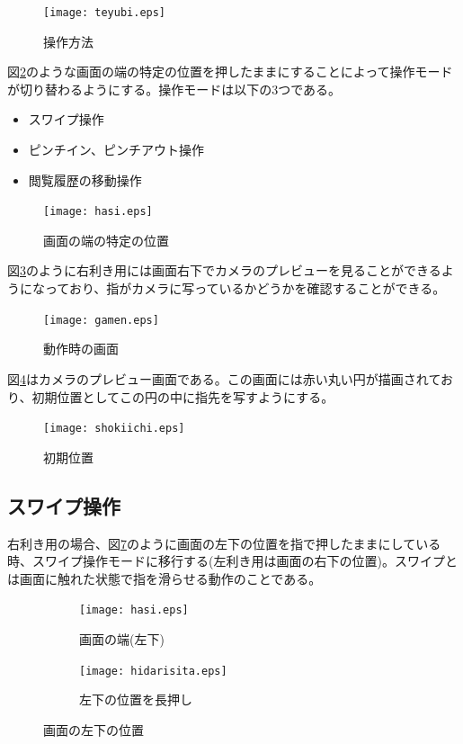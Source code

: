 \documentclass[11pt,a4j, titlepage]{jarticle} %
\begin{document}
\begin{figure}[H]
	\centering
	\texttt{[image: teyubi.eps]}
	\caption{操作方法}
	\label{fig:f3}
\end{figure}

図\ref{fig:f4}のような画面の端の特定の位置を押したままにすることによって操作モードが切り替わるようにする。操作モードは以下の3つである。
\begin{itemize}
	\item スワイプ操作
	\item ピンチイン、ピンチアウト操作
	\item 閲覧履歴の移動操作
\end{itemize}

\begin{figure}[H]
	\centering
	\centering
	\texttt{[image: hasi.eps]}
	\caption{画面の端の特定の位置}
	\label{fig:f4}
\end{figure}

図\ref{fig:f5}のように右利き用には画面右下でカメラのプレビューを見ることができるようになっており、指がカメラに写っているかどうかを確認することができる。

\begin{figure}[H]
	\centering
	\texttt{[image: gamen.eps]}
	\caption{動作時の画面}
	\label{fig:f5}
\end{figure}

図\ref{fig:f6}はカメラのプレビュー画面である。この画面には赤い丸い円が描画されており、初期位置としてこの円の中に指先を写すようにする。

\begin{figure}[H]
	\centering
	\texttt{[image: shokiichi.eps]}
	\caption{初期位置}
	\label{fig:f6}
\end{figure}

\subsection{スワイプ操作}
右利き用の場合、図\ref{fig:f7}のように画面の左下の位置を指で押したままにしている時、スワイプ操作モードに移行する(左利き用は画面の右下の位置)。スワイプとは画面に触れた状態で指を滑らせる動作のことである。

\begin{figure}[H]
	\centering
	\begin{subfigure}{0.4\columnwidth}
		\centering
		\texttt{[image: hasi.eps]}
		\caption{画面の端(左下)}
		\label{fig:hasi1}
	\end{subfigure}
	\begin{subfigure}{0.4\columnwidth}
		\centering
		\texttt{[image: hidarisita.eps]}
		\caption{左下の位置を長押し}
		\label{fig:chuousita}
	\end{subfigure}
	\caption{画面の左下の位置}
	\label{fig:f7}
\end{figure}
\end{document}
